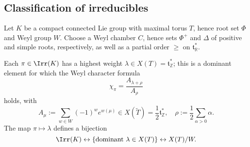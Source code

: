 \documentclass[reqno]{amsart} 
\begin{document}
\subsection{Classification of irreducibles}
\begin{theorem}\label{thm:highest-weight-general-gp}
  Let $K$ be a compact connected Lie group with maximal torus $T$, hence root set $\Phi$ and Weyl group $W$.  Choose a Weyl chamber $C$, hence sets $\Phi^+$ and $\Delta$ of positive and simple roots, respectively, as well as a partial order $\geq$ on $\mathfrak{t}_{\mathbb{R}}^*$.

  Each $\pi \in \Irr(K)$ has a highest weight $\lambda \in X(T) = \mathfrak{t}_{\mathbb{Z}}^*$; this is a dominant element for which the Weyl character formula
  \begin{equation*}
    \chi_{\pi} = \frac{A_{\lambda+\rho}}{A_\rho }
  \end{equation*}
  holds, with
  \begin{equation*}
    A_{\mu} := \sum_{w \in W} (-1)^w e^{w(\mu)} \in X(\tilde{T}) = \frac{1}{2} \mathfrak{t}_{\mathbb{Z}}^*, \quad \rho := \frac{1}{2} \sum_{\alpha > 0} \alpha.
  \end{equation*}
  The map $\pi \mapsto \lambda$ defines a bijection
  \begin{equation*}
    \Irr(K)
    \leftrightarrow \{\text{dominant }
    \lambda \in X(T)\}
    \leftrightarrow
    X(T)/W.
  \end{equation*}
\end{theorem}
\end{document}
